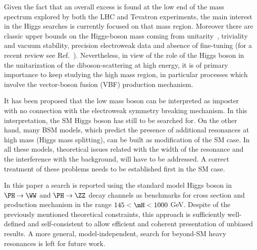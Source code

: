 Given the fact that an overall excess is found at the low end of the 
mass spectrum explored by
both the LHC and Tevatron experiments, the main interest in the Higgs 
searches is currently
focused on that mass region.
Moreover there are classic upper bounds on the Higgs-boson mass coming 
from 
unitarity~\cite{Veltman:1976rt,Lee:1977yc,Lee:1977eg,Passarino:1990hk}, 
triviality and
vacuum stability, precision electroweak data and absence of fine-tuning (for a
recent review see Ref.~\cite{Ellis:2009tp}).
Nevertheless, in view of the role of the Higgs boson in the unitarization of 
the diboson-scattering at high energy,
it is of primary importance to keep studying the high mass region,
in particular processes which involve the vector-boson fusion (VBF) 
production mechanism.

It has been proposed that the low mass boson can be interpreted as 
imposter~\cite{Low:2011gn,Low:2012rj}
with no connection with the electroweak symmetry breaking mechanism. In this
interpretation, the SM Higgs boson has still to be searched for. On the 
other hand, 
many BSM models, which predict 
the presence of additional resonances
at high mass (Higgs mass splitting), can be built as
modification of the SM case. In all these models, theoretical issues 
related with the width of the resonance
and the interference with the background, will have to be addressed. A 
correct treatment of these
problems needs to be established first in the SM case.

In this paper a search is reported 
using the standard model Higgs boson 
in $\PH \to
\WW$ and $\PH \to \ZZ$ decay channels
as benchmarks for cross section and production mechanism 
 in the range $145 < \mH < 1000$ GeV.  
Despite of the previously 
mentioned theoretical constraints,
this approach is sufficiently well-defined and self-consistent to allow
efficient and coherent presentation of unbiased results. A more general, 
model-independent,
search for beyond-SM heavy resonances is left for future work.


